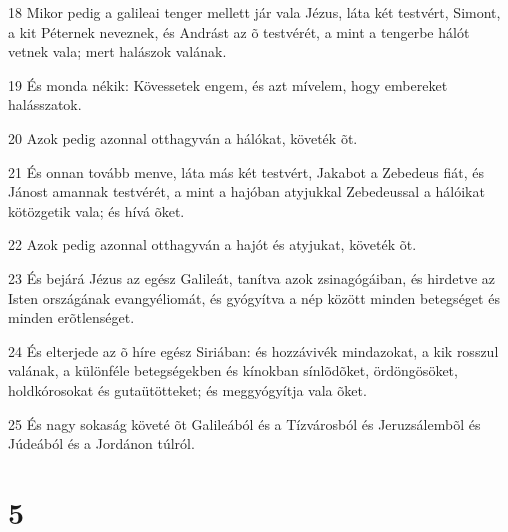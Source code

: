 \par 18 Mikor pedig a galileai tenger mellett jár vala Jézus, láta két testvért, Simont, a kit Péternek neveznek, és Andrást az õ testvérét, a mint a tengerbe hálót vetnek vala; mert halászok valának.
\par 19 És monda nékik: Kövessetek engem, és azt mívelem, hogy embereket halásszatok.
\par 20 Azok pedig azonnal otthagyván a hálókat, követék õt.
\par 21 És onnan tovább menve, láta más két testvért, Jakabot a Zebedeus fiát, és Jánost amannak testvérét, a mint a hajóban atyjukkal Zebedeussal a hálóikat kötözgetik vala; és hívá õket.
\par 22 Azok pedig azonnal otthagyván a hajót és atyjukat, követék õt.
\par 23 És bejárá Jézus az egész Galileát, tanítva azok zsinagógáiban, és hirdetve az Isten országának evangyéliomát, és gyógyítva a nép között minden betegséget és minden erõtlenséget.
\par 24 És elterjede az õ híre egész Siriában: és hozzávivék mindazokat, a kik rosszul valának, a különféle betegségekben és kínokban sínlõdõket, ördöngösöket, holdkórosokat és gutaütötteket; és meggyógyítja vala õket.
\par 25 És nagy sokaság követé õt Galileából és a Tízvárosból és Jeruzsálembõl és Júdeából és a Jordánon túlról.

\chapter{5}

